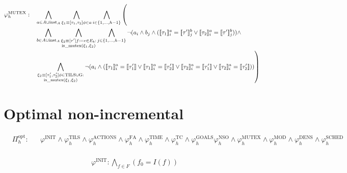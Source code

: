 \documentclass{article}
\begin{document}
\begin{align*}
  &\varphi_{h}^{\text{MUTEX}}:&&\bigwedge\limits_{a \in A \cup \text{inst}_A} \bigwedge\limits_{\xi_1 \equiv [\tau_1, \tau_2]\phi \in a} \bigwedge\limits_{i \in \{1, \ldots, h-1\}} \left( \vphantom{\bigwedge\limits_{a \in A \cup \text{inst}_A} \bigwedge\limits_{\xi_1 \equiv [\tau_1] \text{ev}_1 \in a} \bigwedge\limits_{i \in \{1, \ldots, h-1\}}} \right.\\ & && \bigwedge\limits_{b \in A \cup \text{inst}_A} \bigwedge\limits_{\substack{\xi_2 \equiv [\tau^\prime]f \coloneqq e \in E_b:\\\text{is\_mutex}(\xi_1,\xi_2)}}\bigwedge\limits_{j \in \{1, \ldots, h-1\}} \neg (a_i \land b_j \land (\llbracket \tau_1 \rrbracket_i^a = \llbracket \tau^\prime \rrbracket_j^b \lor \llbracket \tau_2 \rrbracket_i^a = \llbracket \tau^\prime \rrbracket_j^b)) \land \\& && \left. \bigwedge\limits_{\substack{\xi_2 \equiv [\tau_1^\prime, \tau_2^\prime]\phi \in \text{TILS} \cup \text{G}:\\ \text{is\_mutex}(\xi_1, \xi_2)}} \neg (a_i \land (\llbracket \tau_1 \rrbracket_i^a = \llbracket \tau_1^\prime \rrbracket \lor \llbracket \tau_1 \rrbracket_i^a = \llbracket \tau_2^\prime \rrbracket \lor \llbracket \tau_2 \rrbracket_i^a = \llbracket \tau_1^\prime \rrbracket \lor \llbracket \tau_2 \rrbracket_i^a = \llbracket \tau_2^\prime \rrbracket))\vphantom{\bigwedge\limits_{a \in A \cup \text{inst}_A} \bigwedge\limits_{\text{ev}_1 \equiv [\tau_1] e_1 \in a} \bigwedge\limits_{i \in \{1, \ldots, h-1\}}}\right)
\end{align*}

\section{Optimal non-incremental}

\begin{align*}
  &\Pi_h^{\text{opt}}: && \varphi^{\text{INIT}} \land \varphi_h^{\text{TILS}} \land \varphi_h^{\text{ACTIONS}} \land \varphi_h^{\text{FA}} \land \varphi_h^{\text{TIME}} \land \varphi_h^{\text{TC}} \land \varphi_h^{\text{GOALS}} \varphi_h^{\text{NSO}} \land \varphi_h^{\text{MUTEX}} \land \varphi_h^{\text{MOD}} \land \varphi_h^{\text{DENS}} \land \varphi_h^{\text{SCHED}} \\
\end{align*}

\begin{align*}
  &\varphi^{\text{INIT}}: \bigwedge\limits_{f \in F} \left( f_{0} = I(f) \right)
\end{align*}
\end{document}
